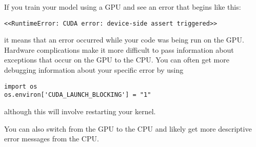 \begin{warn}
If you train your model using a GPU and see an error that begins like this:

\begin{lstlisting}
<<RuntimeError: CUDA error: device-side assert triggered>>
\end{lstlisting}

it means that an error occurred while your code was being run on the GPU. Hardware complications make it more difficult to pass information about exceptions that occur on the GPU to the CPU. You can often get more debugging information about your specific error by using 

\begin{lstlisting}
import os
os.environ['CUDA_LAUNCH_BLOCKING'] = "1"
\end{lstlisting}

although this will involve restarting your kernel.

You can also switch from the GPU to the CPU and likely get more descriptive error messages from the CPU.
\end{warn}

